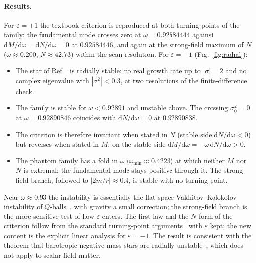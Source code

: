 \documentclass[11pt]{article}
\theoremstyle{remark}
\newcommand{\dd}{\mathrm{d}}
\begin{document}
\paragraph{Results.} For $\varepsilon=+1$ the textbook criterion is reproduced at both turning points of the family: the
fundamental mode crosses zero at $\omega=0.92584444$ against $\dd M/\dd\omega=\dd N/\dd\omega=0$ at $0.92584446$, and
again at the strong-field maximum of $N$ ($\omega\approx0.200$, $N\approx42.73$) within the scan resolution. For
$\varepsilon=-1$ (Fig.~\ref{fig:radial}):
\begin{itemize}
\item The star of Ref.~\cite{Shirokov2026} is radially stable: no real growth rate up to $|\sigma|=2$ and no complex
eigenvalue with $|\sigma^2|<0.3$, at two resolutions of the finite-difference check.
\item The family is stable for $\omega<0.92891$ and unstable above. The crossing $\sigma_0^2=0$ at $\omega=0.92890846$
coincides with $\dd N/\dd\omega=0$ at $0.92890838$.
\item The criterion is therefore invariant when stated in $N$ (stable side $\dd N/\dd\omega<0$) but reverses when
stated in $M$: on the stable side $\dd M/\dd\omega=-\omega\,\dd N/\dd\omega>0$.
\item The phantom family has a fold in $\omega$ ($\omega_{\min}\approx0.4223$) at which neither $M$ nor $N$ is
extremal; the fundamental mode stays positive through it. The strong-field branch, followed to $|2m/r|\approx0.4$, is
stable with no turning point.
\end{itemize}
Near $\omega\approx0.93$ the instability is essentially the flat-space Vakhitov--Kolokolov instability of
$Q$-balls~\cite{Coleman1985,FLP1987}, with gravity a small correction; the strong-field branch is the more sensitive
test of how $\varepsilon$ enters. The first law and the $N$-form of the criterion follow from the standard turning-point
arguments~\cite{Sorkin1982,LeePang1989,KMS1991} with $\varepsilon$ kept; the new content is the explicit linear analysis
for $\varepsilon=-1$. The result is consistent with the theorem that barotropic negative-mass stars are radially
unstable~\cite{Alves2025}, which does not apply to scalar-field matter.
\end{document}
